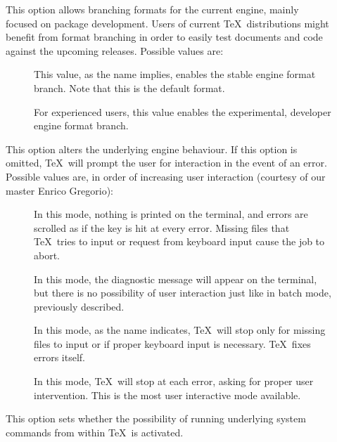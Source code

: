 \begin{description}
\begin{description}
\item[] This option allows branching formats for the current engine, mainly focused on package development. Users of current \TeX\ distributions might benefit from format branching in order to easily test documents and code against the upcoming releases. Possible values are:

\begin{description}
\item[] This value, as the name implies, enables the stable engine format branch. Note that this is the default format.

\item[] For experienced users, this value enables the experimental, developer engine format branch.
\end{description}

\item[] This option alters the underlying engine behaviour. If this option is omitted, \TeX\ will prompt the user for interaction in the event of an error. Possible values are, in order of increasing user interaction (courtesy of our master Enrico Gregorio):

\begin{description}
\item[] In this mode, nothing is printed on the terminal, and errors are scrolled as if the  key is hit at every error. Missing files that \TeX\ tries to input or request from keyboard input cause the job to abort.

\item[] In this mode, the diagnostic message will appear on the terminal, but there is no possibility of user interaction just like in batch mode, previously described.

\item[] In this mode, as the name indicates, \TeX\ will stop only for missing files to input or if proper keyboard input is necessary. \TeX\ fixes errors itself.

\item[] In this mode, \TeX\ will stop at each error, asking for proper user intervention. This is the most user interactive mode available.
\end{description}

\item[] This option sets whether the possibility of running underlying system commands from within \TeX\ is activated.


\end{description}
\end{description}
